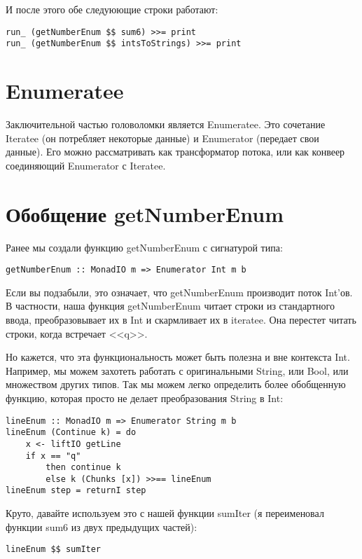 И после этого обе следуюющие строки работают:

\begin{lstlisting}
run_ (getNumberEnum $$ sum6) >>= print
run_ (getNumberEnum $$ intsToStrings) >>= print
\end{lstlisting}%

\section{Enumeratee}

Заключительной частью головоломки является Enumeratee. Это сочетание Iteratee (он потребляет некоторые данные) и Enumerator (передает свои данные). Его можно рассматривать как трансформатор потока, или как конвеер соединяющий Enumerator с Iteratee.

\section{Обобщение getNumberEnum}

Ранее мы создали функцию getNumberEnum с сигнатурой типа:

\begin{lstlisting}
getNumberEnum :: MonadIO m => Enumerator Int m b
\end{lstlisting}

Если вы подзабыли, это означает, что getNumberEnum производит поток Int'ов. В частности, наша функция getNumberEnum читает строки из стандартного ввода, преобразовывает их в Int и скармливает их в iteratee. Она перестет читать строки, когда встречает <<q>>. 

Но кажется, что эта функциональность может быть полезна и вне контекста Int. Например, мы можем захотеть работать с оригинальными String, или Bool, или множеством других типов. Так мы можем легко определить более обобщенную функцию, которая просто не делает преобразования String в Int:

\begin{lstlisting}
lineEnum :: MonadIO m => Enumerator String m b
lineEnum (Continue k) = do
    x <- liftIO getLine
    if x == "q"
        then continue k
        else k (Chunks [x]) >>== lineEnum
lineEnum step = returnI step
\end{lstlisting}

Круто, давайте используем это с нашей функции sumIter (я переименовал функции sum6 из двух предыдущих частей):
\begin{lstlisting}
lineEnum $$ sumIter
\end{lstlisting}%

